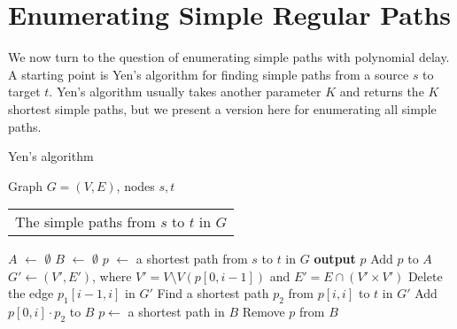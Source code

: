 \documentclass[a4paper,english]{lipics-v2016}
\theoremstyle{plain}
\begin{document}
\section{Enumerating Simple Regular Paths}\label{sec:enum-yen}

We now turn to the question of enumerating simple paths with
polynomial delay. A starting point is Yen's algorithm \cite{yen} for
finding simple paths from a source $s$ to target $t$. Yen's algorithm
usually takes another parameter $K$ and returns the $K$ shortest simple paths, but
we present a version here for enumerating all simple paths.


\begin{algorithm}[t]
\algrenewcommand\algorithmicindent{10pt}\caption{Yen's algorithm}
\begin{algorithmic}[1]
\Require Graph $G=(V,E)$, nodes $s,t$ 
\Ensure \begin{tabular}[t]{l}
  The simple paths from $s$ to $t$ in $G$   \end{tabular}
\State $A$ $\gets$ $\emptyset$ 
\State $B$ $\gets$ $\emptyset$ 
\State $p$ $\gets$ a shortest path from $s$ to $t$ in $G$ \label{alg:yen:3}
 
\State \textbf{output} $p$
\State Add $p$ to $A$ \label{alg:yen:6}
\State $G' \gets (V',E')$, where $V' = V\setminus V(p[0,i-1])$ and $E' = E \cap (V' \times V')$
    \label{alg:yen:8}
  \label{alg:yen:9}
    \State Delete the edge $p_1[i-1,i]$ in $G'$   \EndFor
  \State Find a shortest path $p_2$ from $p[i,i]$ to $t$ in $G'$ 
  		\label{alg:yen:12}  \State Add $p[0,i]\cdot p_2$ to $B$  \label{alg:yen:13}
\EndFor
\State $p \gets$ a shortest path in $B$  \label{alg:yen:15}
\State Remove $p$ from $B$
\EndWhile
\end{algorithmic}
\label{alg:yen}
\end{algorithm}
\end{document}
